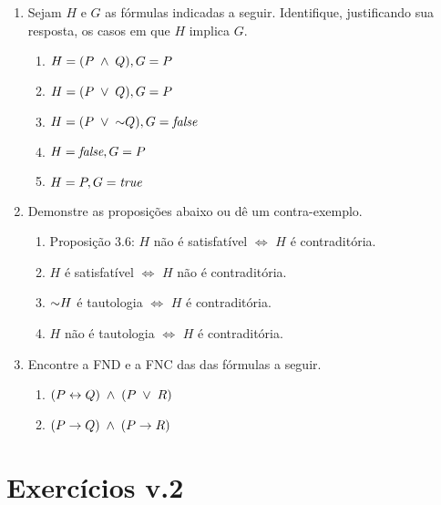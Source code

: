 \begin{enumerate}
  \item Sejam $H$ e $G$ as fórmulas indicadas a seguir. Identifique, justificando sua resposta, os casos em que $H$ implica $G$.
    \begin{enumerate}
      \item $H = (P \;\land\; Q), G = P$
      \item $H = (P \;\lor\;  Q), G = P$
      \item $H = (P \;\lor\; \mathord{\sim} Q), G = \textit{false}$
      \item $H = \textit{false}, G = P$
      \item $H = P, G = \textit{true}$
    \end{enumerate}

  \item Demonstre as proposições abaixo ou dê um contra-exemplo.
    \begin{enumerate}
      \item Proposição 3.6: $H$ não é satisfatível $\Leftrightarrow$ $H$ é contraditória.
      \item $H$ é satisfatível $\Leftrightarrow$ $H$ não é contraditória.
      \item $\mathord{\sim} H$ é tautologia $\Leftrightarrow$ $H$ é contraditória.
      \item $H$ não é tautologia $\Leftrightarrow$ $H$ é contraditória.
    \end{enumerate}
  
  \item Encontre a FND e a FNC das das fórmulas a seguir.
    \begin{enumerate}
      \item $(P \leftrightarrow Q) \;\land\; (P \;\lor\; R)$
      \item $(P \rightarrow Q) \;\land\; (P \rightarrow R)$
    \end{enumerate}


\end{enumerate}



\section{Exercícios v.2}


